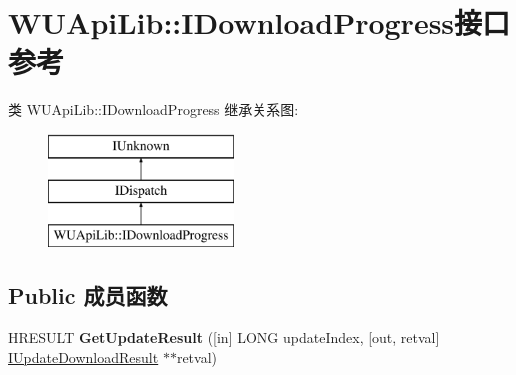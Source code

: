 \hypertarget{interface_w_u_api_lib_1_1_i_download_progress}{}\section{W\+U\+Api\+Lib\+:\+:I\+Download\+Progress接口 参考}
\label{interface_w_u_api_lib_1_1_i_download_progress}
类 W\+U\+Api\+Lib\+:\+:I\+Download\+Progress 继承关系图\+:\begin{figure}[H]
\begin{center}
\leavevmode
\includegraphics[height=3.000000cm]{interface_w_u_api_lib_1_1_i_download_progress}
\end{center}
\end{figure}
\subsection*{Public 成员函数}
\begin{DoxyCompactItemize}
\item 
\mbox{\label{interface_w_u_api_lib_1_1_i_download_progress_ace6747a06c05e0ea4c9c5e0656e1aed9}} 
H\+R\+E\+S\+U\+LT {\bfseries Get\+Update\+Result} (\mbox{[}in\mbox{]} L\+O\+NG update\+Index, \mbox{[}out, retval\mbox{]} \hyperlink{interface_w_u_api_lib_1_1_i_update_download_result}{I\+Update\+Download\+Result} $\ast$$\ast$retval)
\end{DoxyCompactItemize}
